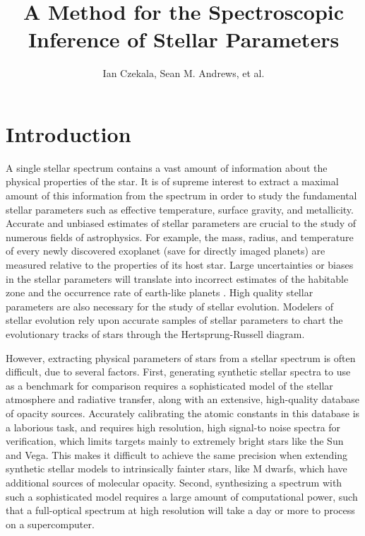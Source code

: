 \documentclass[iop,floatfix]{emulateapj}
\begin{document}
\graphicspath{{figs/}}



\title{A Method for the Spectroscopic Inference of Stellar Parameters}
\author{Ian Czekala, Sean M. Andrews, et al.}

\section{Introduction \label{sec:intro}}

A single stellar spectrum contains a vast amount of information about the physical properties of the star. It is of supreme interest to extract a maximal amount of this information from the spectrum in order to study the fundamental stellar parameters such as effective temperature, surface gravity, and metallicity. Accurate and unbiased estimates of stellar parameters are crucial to the study of numerous fields of astrophysics. For example, the mass, radius, and temperature of every newly discovered exoplanet (save for directly imaged planets) are measured relative to the properties of its host star. Large uncertainties or biases in the stellar parameters will translate into incorrect estimates of the habitable zone and the occurrence rate of earth-like planets \citep{kane14}. High quality stellar parameters are also necessary for the study of stellar evolution. Modelers of stellar evolution rely upon accurate samples of stellar parameters to chart the evolutionary tracks of stars through the Hertsprung-Russell diagram.

However, extracting physical parameters of stars from a stellar spectrum is often difficult, due to several factors. First, generating synthetic stellar spectra to use as a benchmark for comparison requires a sophisticated model of the stellar atmosphere and radiative transfer, along with an extensive, high-quality database of opacity sources. Accurately calibrating the atomic constants in this database is a laborious task, and requires high resolution, high signal-to noise spectra for verification, which limits targets mainly to extremely bright stars like the Sun and Vega. This makes it difficult to achieve the same precision when extending synthetic stellar models to intrinsically fainter stars, like M dwarfs, which have additional sources of molecular opacity. Second,  synthesizing a spectrum with such a sophisticated model requires a large amount of computational power, such that a full-optical spectrum at high resolution will take a day or more to process on a supercomputer. 
\end{document}
